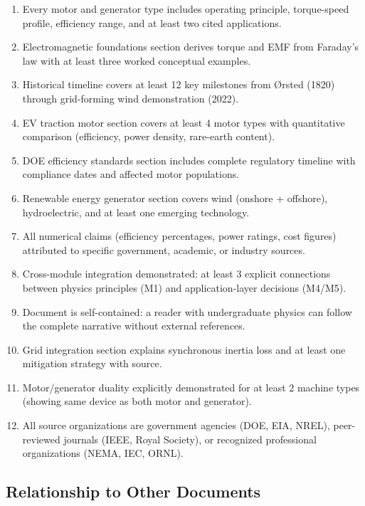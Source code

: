 \documentclass[11pt,letterpaper]{article}
\begin{document}
\begin{enumerate}[leftmargin=2em]
\item Every motor and generator type includes operating principle, torque-speed profile, efficiency range, and at least two cited applications.
\item Electromagnetic foundations section derives torque and EMF from Faraday's law with at least three worked conceptual examples.
\item Historical timeline covers at least 12 key milestones from \O rsted (1820) through grid-forming wind demonstration (2022).
\item EV traction motor section covers at least 4 motor types with quantitative comparison (efficiency, power density, rare-earth content).
\item DOE efficiency standards section includes complete regulatory timeline with compliance dates and affected motor populations.
\item Renewable energy generator section covers wind (onshore + offshore), hydroelectric, and at least one emerging technology.
\item All numerical claims (efficiency percentages, power ratings, cost figures) attributed to specific government, academic, or industry sources.
\item Cross-module integration demonstrated: at least 3 explicit connections between physics principles (M1) and application-layer decisions (M4/M5).
\item Document is self-contained: a reader with undergraduate physics can follow the complete narrative without external references.
\item Grid integration section explains synchronous inertia loss and at least one mitigation strategy with source.
\item Motor/generator duality explicitly demonstrated for at least 2 machine types (showing same device as both motor and generator).
\item All source organizations are government agencies (DOE, EIA, NREL), peer-reviewed journals (IEEE, Royal Society), or recognized professional organizations (NEMA, IEC, ORNL).
\end{enumerate}

\subsection{Relationship to Other Documents}
\end{document}
